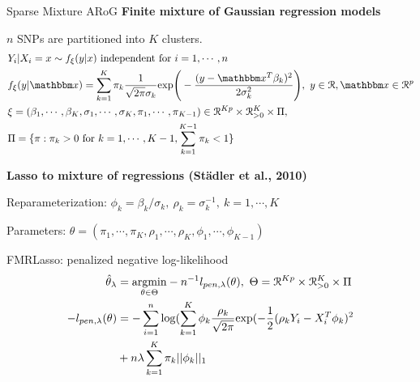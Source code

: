 \documentclass[final]{beamer}
\begin{document}
\begin{frame}{}
\begin{columns}[t]
\begin{column}{1\linewidth}
\begin{columns}
\begin{column}{.26\textwidth}
\begin{block}{Sparse Mixture ARoG}
{\color{orange!100} \textbf{Finite mixture of Gaussian regression models}}
\centering
\bi
\item $n$ SNPs are partitioned into $K$ clusters.
\ei
{\small
\begin{align*}
&Y_i|X_i=x \sim f_{\xi}(y|x) \text{ independent for } i=1,\cdots, n\\
&f_{\xi}(y|\bx)=\dis\sum_{k=1}^K\pi_k\dis\frac{1}{\sqrt{2\pi}\sigma_k}\mathrm{exp}\Bigg(-\dis\frac{(y-\bx^T\beta_k)^2}{2\sigma^2_k}\Bigg),   ~y \in \R, \bx\in \R^p\\%
&\xi=(\beta_1,\cdots, \beta_K, \sigma_1,\cdots, \sigma_K, \pi_1,\cdots,\pi_{K-1})\in \R^{Kp}\times \R^K_{>0}\times \Pi,\\
&\Pi=\{\pi: \pi_k>0 \text{ for } k=1,\cdots, K-1, \dis\sum_{k=1}^{K-1}\pi_k<1\}
\end{align*}
}

{\color{orange!100} \textbf{Lasso to mixture of regressions (St\"{a}dler et al., 2010)}}
\bi
\item Reparameterization: {\small
$\phi_k=\beta_k/\sigma_k,~\rho_k=\sigma^{-1}_k,~k=1, \cdots, K$
}
\item Parameters: {\small
$\theta=(\pi_1, \cdots, \pi_K, \rho_1, \cdots, \rho_K, \phi_1, \cdots, \phi_{K-1})$
}
\item FMRLasso: penalized negative log-likelihood
{\small
\begin{align*}
\hat{\theta}_{\lambda}&=\underset{\theta \in \Theta}{\mathrm{argmin}}-n^{-1}l_{pen,\lambda}(\theta),~\Theta=\mathcal{R}^{Kp}\times \mathcal{R}^K_{>0}\times \Pi\\
-l_{pen,\lambda}(\theta)&=-\displaystyle\sum_{i=1}^n\mathrm{log}(\displaystyle\sum_{k=1}^K\phi_k\displaystyle\frac{\rho_k}{\sqrt{2\pi}}\mathrm{exp}(-\displaystyle\frac{1}{2}(\rho_kY_i-X_i^T\phi_k)^2\\
&+n\lambda\displaystyle\sum_{k=1}^{K}\pi_k||\phi_k||_1\\
\end{align*}
}
\ei


\end{block}
\end{column}
\end{columns}
\end{column}
\end{columns}
\end{frame}
\end{document}
